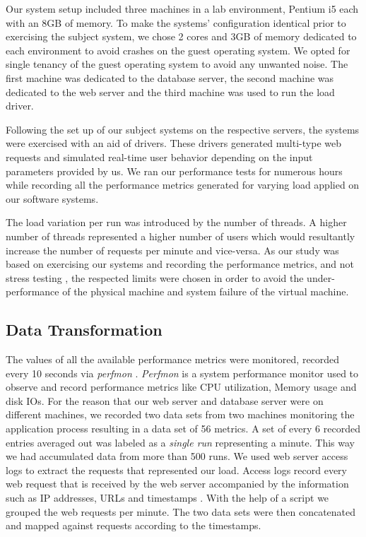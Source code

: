 Our system setup included three machines in a lab environment, Pentium i5 each with an 8GB of memory. To make the systems' configuration identical prior to exercising the subject system, we chose 2 cores and 3GB of memory dedicated to each environment to avoid crashes on the guest operating system. We opted for single tenancy of the guest operating system to avoid any unwanted noise. The first machine was dedicated to the database server, the second machine was dedicated to the web server and the third machine was used to run the load driver.

Following the set up of our subject systems on the respective servers, the systems were exercised with an aid of drivers. These drivers generated multi-type web requests and simulated real-time user behavior depending on the input parameters provided by us. We ran our performance tests for numerous hours while recording all the performance metrics generated for varying load applied on our software systems.

The load variation per run was introduced by the number of threads. A higher number of threads represented a higher number of users which would resultantly increase the number of requests per minute and vice-versa. As our study was based on exercising our systems and recording the performance metrics, and not stress testing \cite{stresstesting}, the respected limits were chosen in order to avoid the under-performance of the physical machine and system failure of the virtual machine.

\subsection{Data Transformation}
The values of all the available performance metrics were monitored, recorded every 10 seconds via \textit{perfmon} \cite{windowsperfmon}\cite{perfmon}. \textit{Perfmon} is a system performance monitor used to observe and record performance metrics like CPU utilization, Memory usage and disk IOs. For the reason that our web server and database server were on different machines, we recorded two data sets from two machines monitoring the application process resulting in a data set of 56 metrics. A set of every 6 recorded entries averaged out was labeled as a \textit{single run} representing a minute. This way we had accumulated data from more than 500 runs. We used web server access logs to extract the requests that represented our load. Access logs record every web request that is received by the web server accompanied by the information such as IP addresses, URLs and timestamps \cite{weinberg2003use}. With the help of a script we grouped the web requests per minute. The two data sets were then concatenated and mapped against requests according to the timestamps.

